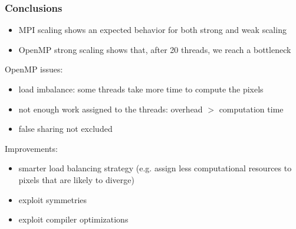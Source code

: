 \documentclass{beamer}
\begin{document}
\begin{frame}
    \frametitle{Conclusions}
    \begin{itemize}
        \item MPI scaling shows an expected behavior for both strong and weak scaling
        \item OpenMP strong scaling shows that, after 20 threads, we reach a bottleneck
    \end{itemize}
     
    OpenMP issues:
    \begin{itemize}
        \item load imbalance: some threads take more time to compute the pixels
        \item not enough work assigned to the threads: overhead $>$ computation time
        \item false sharing not excluded
    \end{itemize}

    Improvements:
    \begin{itemize}
        \item smarter load balancing strategy (e.g. assign less computational resources to pixels that are likely to diverge)
        \item exploit symmetries
        \item exploit compiler optimizations
    \end{itemize}

\end{frame}
\end{document}
